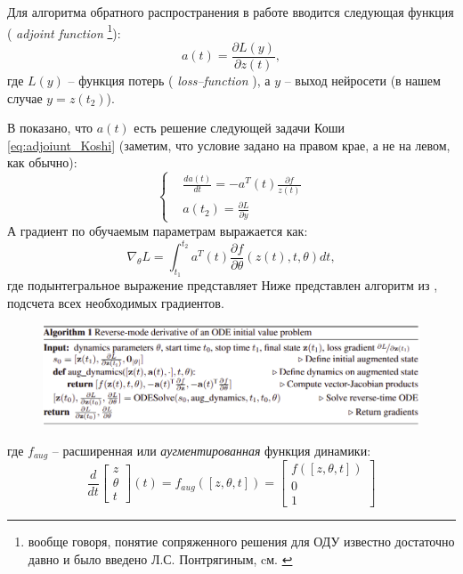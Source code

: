 \documentclass[]{scrartcl}
\newcommand{\tit}[1]{%
\textit{#1}%
}
\begin{document}
Для алгоритма обратного распространения в работе \cite{NeuralODE} вводится следующая функция (\tit{adjoint function}\footnote{вообще говоря, понятие сопряженного решения для ОДУ известно достаточно давно и было введено Л.С. Понтрягиным, cм. \cite{PontryaginPrinciples}}):
$$
a(t) = \frac{\partial L(y)}{ \partial z(t) },
$$
где $L(y)$ -- функция потерь (\tit{loss--function}), а $y$ -- выход нейросети (в нашем случае $y=z(t_2)$).

В \cite{NeuralODE} показано, что $a(t)$ есть решение следующей задачи Коши \eqref{eq:adjoiunt_Koshi} (заметим, что условие задано на правом крае, а не на левом, как обычно):
\begin{equation} \label{eq:adjoiunt_Koshi}
\left\{ \begin{aligned}
  		& \frac{d a(t)}{dt} = - a^T(t) \frac{\partial f}{ z(t)} \\
		& a(t_2) = \frac{\partial L}{ \partial y}
\end{aligned} \right.
\end{equation}
А градиент по обучаемым параметрам выражается как:
\begin{equation} \label{eq:grad_loss_theta}
 \nabla_{\theta} L = \int_{t_1}^{t_2} a^T(t) \frac{\partial f}{\partial \theta} \left( z(t), t, \theta \right) dt,
\end{equation}
где подынтегральное выражение представляет  
Ниже представлен алгоритм из \cite{NeuralODE}, подсчета всех необходимых градиентов. 

\begin{figure}[h!]
\centering
\includegraphics[width= 0.95 \linewidth]{grad_alg.png}
\end{figure}

где $f_{aug}$ -- расширенная или \textit{аугментированная} функция динамики:
$$
\frac{d}{dt} \begin{bmatrix}
z \\
\theta \\
t
\end{bmatrix} (t) = f_{aug} \left( \left[ z, \theta, t \right]  \right) = \begin{bmatrix}
f \left(  \left[ z, \theta, t \right] \right) \\
0 \\
1
\end{bmatrix}
$$
\end{document}

